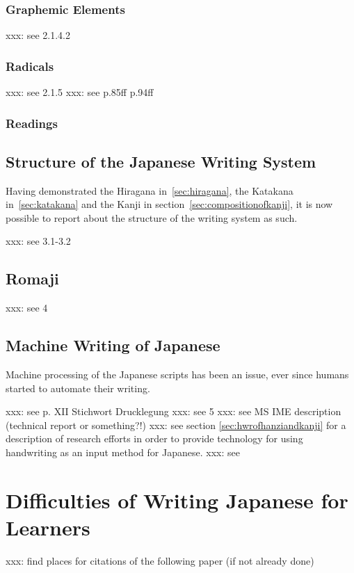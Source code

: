 \subsubsection{Graphemic Elements}
\label{sec:graphemicelements}

xxx: see  2.1.4.2

\subsubsection{Radicals}
\label{sec:radicals}

xxx: see  2.1.5
xxx: see  p.85ff p.94ff

\subsubsection{Readings}
\label{sec:readings}

\subsection{Structure of the Japanese Writing System}
\label{sec:structureofwritingsystem}
Having demonstrated the Hiragana in~\ref{sec:hiragana}, the Katakana 
in~\ref{sec:katakana} and the Kanji in section~\ref{sec:compositionofkanji}, 
it is now possible to report about the structure of the writing system as such.

xxx: see  3.1-3.2

\subsection{Romaji }
\label{sec:romaji}
xxx: see  4

\subsection{Machine Writing of Japanese}
\label{sec:machinewritingofjapanese}

Machine processing of the Japanese scripts has been an issue, ever since humans
started to automate their writing.

xxx: see  p. XII Stichwort Drucklegung
xxx: see  5
xxx: see MS IME description (technical report or something?!)
xxx: see section \ref{sec:hwrofhanziandkanji} for a description of research 
efforts in order to provide technology for using handwriting as an input method 
for Japanese.
xxx: see 


\section{Difficulties of Writing Japanese for Learners}
\label{sec:writingjapanesedifficulties}


xxx: find places for citations of the following paper (if not already done)
